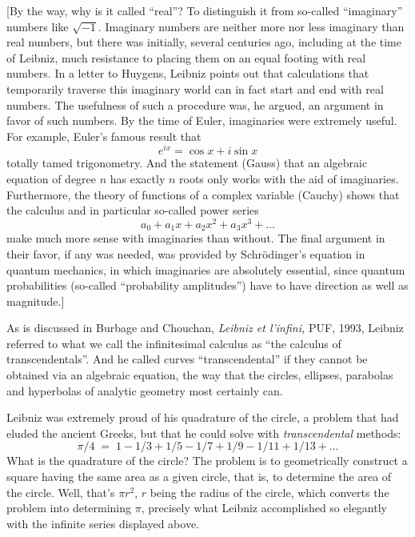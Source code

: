 \documentclass[12pt]{book}
\begin{document}
{\footnotesize
[By the way,
why is it called ``real''? To distinguish it from so-called ``imaginary'' numbers like $\sqrt{-1}$.
Imaginary numbers are neither more nor less imaginary than real numbers, but there was initially,
several centuries ago, including at the time of Leibniz, much resistance to placing them on 
an equal footing with real numbers.  In a letter to Huygens, Leibniz points out that calculations
that temporarily traverse this imaginary world can in fact start and end with real numbers.
The usefulness of such a procedure was, he argued, an argument in favor of such numbers.
By the time of Euler, imaginaries were extremely useful. For example, Euler's famous result
that 
\[
   e^{i x} = \cos x + i \sin x 
\] 
totally tamed trigonometry.
And the statement (Gauss)
that an algebraic equation of degree $n$ has exactly $n$ roots only works with the 
aid of imaginaries. Furthermore, the theory of functions of a complex variable (Cauchy)
shows that the calculus and in particular so-called power series
\[
   a_0 + a_1 x + a_2 x^2 + a_3 x^3 + \ldots
\] 
make much more sense with imaginaries than without. The final argument in their favor, if any was needed, was provided by Schr\"odinger's equation
in quantum mechanics, in which imaginaries are absolutely essential, since quantum probabilities
(so-called ``probability amplitudes'') have to have direction as well as magnitude.]

}

\medskip

As is discussed in Burbage and Chouchan, \emph{Leibniz et l'infini,} PUF, 1993,
Leibniz referred to what we call the infinitesimal calculus as ``the calculus of
transcendentals''. And he called curves ``transcendental'' if they cannot be obtained via
an algebraic equation, the way that the circles, ellipses, parabolas and hyperbolas
of analytic geometry most certainly can.  
 
Leibniz was extremely proud of his quadrature of the circle, a problem that had eluded
the ancient Greeks, but that he could solve with \emph{transcendental} methods:
\[
 \pi/4 \; = \; 1 - 1/3 + 1/5 - 1/7 + 1/9 - 1/11 + 1/13 + \ldots
\] 
What is the quadrature of the circle? 
The problem is to geometrically construct a square having the same area as a given circle, that
is, to determine the area of the circle. Well, that's $\pi r^2$, $r$ being the radius
of the circle, which converts the problem into determining $\pi$, precisely what Leibniz accomplished
so elegantly with the infinite series displayed above.
 
\end{document}
